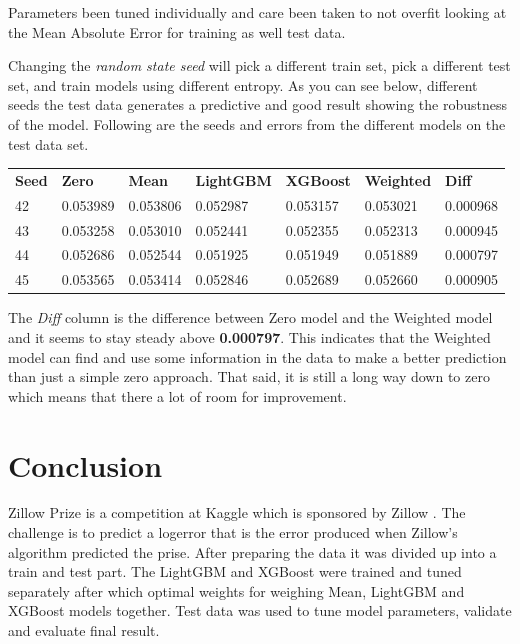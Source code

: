 \documentclass[a4paper]{article}
\begin{document}
Parameters been tuned individually and care been taken to not overfit looking at the Mean Absolute Error for training as well test data.

Changing the \textit{random state seed} will pick a different train set, pick a different test set, and train models using different entropy. As you can see below, different seeds the test data generates a predictive and good result showing the robustness of the model. Following are the seeds and errors from the different models on the test data set.
\begin{center}
\begin{tabular}{ l l l l l l l }
    \textbf{Seed} & \textbf{Zero} & \textbf{Mean} & \textbf{LightGBM} & \textbf{XGBoost} & \textbf{Weighted} & \textbf{Diff} \\
    42 & 0.053989 & 0.053806 & 0.052987 & 0.053157 & 0.053021 & 0.000968 \\
    43 & 0.053258 & 0.053010 & 0.052441 & 0.052355 & 0.052313 & 0.000945 \\
    44 & 0.052686 & 0.052544 & 0.051925 & 0.051949 & 0.051889 & 0.000797 \\
    45 & 0.053565 & 0.053414 & 0.052846 & 0.052689 & 0.052660 & 0.000905 \\
\end{tabular}
\end{center}
The \textit{Diff} column is the difference between Zero model and the Weighted model and it seems to stay steady above \textbf{0.000797}. This indicates that the Weighted model can find and use some information in the data to make a better prediction than just a simple zero approach. That said, it is still a long way down to zero which means that there a lot of room for improvement.


\section{Conclusion}
Zillow Prize \cite{zillowprize} is a competition at Kaggle \cite{kaggle} which is sponsored by Zillow \cite{zillow}. The challenge is to predict a logerror that is the error produced when Zillow's algorithm predicted the prise. After preparing the data it was divided up into a train and test part. The LightGBM \cite{lightgbm} and XGBoost \cite{xgboost} were trained and tuned separately after which optimal weights for weighing Mean, LightGBM \cite{lightgbm} and XGBoost \cite{xgboost} models together. Test data was used to tune model parameters, validate and evaluate final result.
\end{document}
